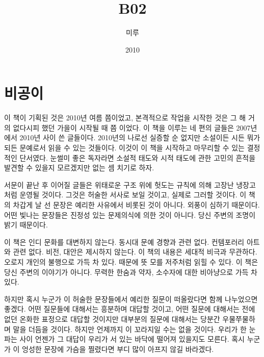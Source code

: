 \documentclass[a5paper,10pt, twoside, openright]{memoir}
\begin{document}
			\frontmatter 	
	
	\begin{titlingpage} %
			\title{B02}
			\author{미루}
			\date{2010}
		\maketitle
	\end{titlingpage}



		\chapter*{비공이} %
	이 책이 기획된 것은 2010년 여름 쯤이었고, 본격적으로 작업을 시작한 것은 그 해 거의 없다시피 했던 가을이 시작될 때 쯤 이었다. 이 책을 이루는 네 편의 글들은 2007년에서 2010년 사이 쓴 글들이다. 2010년의 나로선 실증할 순 없지만 소설이든 시든 뭐가 되든 문예로서 읽을 수 있는 것들이다. 이것이 이 책을 시작하고 마무리할 수 있는 결정적인 단서였다. 눈썰미 좋은 독자라면 소설적 태도와 시적 태도에 관한 고민의 흔적을 발견할 수 있을지 모르겠지만 없는 셈 치기로 하자.

	서문이 끝난 후 이어질 글들은 위태로운 구조 위에 헛도는 규칙에 의해 고장난 냉장고처럼 운영될 것이다. 그것은 허술한 서사로 보일 것이고, 실제로 그러할 것이다. 이 책의 차갑게 날 선 문장은 예리한 사유에서 비롯된 것이 아니다. 외풍이 심하기 때문이다. 어떤 빛나는 문장들은 진정성 있는 문제의식에 의한 것이 아니다. 당신 주변의 조명이 밝기 때문이다. 
	
	이 책은 인디 문화를 대변하지 않는다. 동시대 문예 경향과 관련 없다. 컨템포러리 아트와 관련 없다. 비전, 대안은 제시하지 않는다. 이 책의 내용은 세대적 비극과 무관하다. 오로지 개인의 불행으로 가득 차 있다. 때문에 뜻 모를 저주처럼 읽힐 수 있다. 이 책은 당신 주변의 이야기가 아니다. 무력한 한숨과 약자, 소수자에 대한 비아냥으로 가득 차 있다.

	하지만 혹시 누군가 이 허술한 문장들에서 예리한 질문이 떠올랐다면 함께 나누었으면 좋겠다. 어떤 질문들에 대해서는 흥분하며 대답할 것이고, 어떤 질문에 대해서는 전에 없던 온화한 표정으로 대답할 것이지만 대부분의 질문에 대해서는 당분간 우물쭈물하며 말을 더듬을 것이다. 하지만 언제까지 이 꼬라지일 수는 없을 것이다. 우리가 한 눈 파는 사이 언젠가 그 대답이 우리가 서 있는 바닥에 떨어져 있을지도 모른다. 혹시 누군가 이 엉성한 문장에 가슴을 찔렸다면 부디 많이 아프지 않길 바라겠다.
\end{document}
